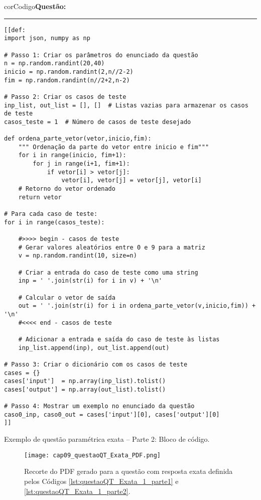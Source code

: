 \begin{listing}[!h]
\begin{myboxCode}{corCodigo}{\textbf{Questão: }}\vspace{3mm}
\hrule
\begin{verbatim}
[[def: 
import json, numpy as np

# Passo 1: Criar os parâmetros do enunciado da questão
n = np.random.randint(20,40)
inicio = np.random.randint(2,n//2-2)
fim = np.random.randint(n//2+2,n-2)
    
# Passo 2: Criar os casos de teste
inp_list, out_list = [], []  # Listas vazias para armazenar os casos de teste
casos_teste = 1  # Número de casos de teste desejado

def ordena_parte_vetor(vetor,inicio,fim):        
    """ Ordenação da parte do vetor entre inicio e fim"""
    for i in range(inicio, fim+1):
        for j in range(i+1, fim+1):
            if vetor[i] > vetor[j]:
                vetor[i], vetor[j] = vetor[j], vetor[i]
    # Retorno do vetor ordenado
    return vetor
    
# Para cada caso de teste:
for i in range(casos_teste):    

    #>>>> begin - casos de teste
    # Gerar valores aleatórios entre 0 e 9 para a matriz 
    v = np.random.randint(10, size=n) 

    # Criar a entrada do caso de teste como uma string
    inp = ' '.join(str(i) for i in v) + '\n'

    # Calcular o vetor de saída
    out = ' '.join(str(i) for i in ordena_parte_vetor(v,inicio,fim)) + '\n'
    #<<<< end - casos de teste

    # Adicionar a entrada e saída do caso de teste às listas
    inp_list.append(inp), out_list.append(out)

# Passo 3: Criar o dicionário com os casos de teste
cases = {}
cases['input']  = np.array(inp_list).tolist()
cases['output'] = np.array(out_list).tolist()

# Passo 4: Mostrar um exemplo no enunciado da questão
caso0_inp, caso0_out = cases['input'][0], cases['output'][0]
]]
\end{verbatim}
\end{myboxCode}
\caption{Exemplo de questão paramétrica exata -- Parte 2: Bloco de código.}
\label{lst:questaoQT_Exata_1_parte2}
\end{listing}


\begin{figure}[!ht]
  \texttt{[image: cap09\_questaoQT\_Exata\_PDF.png]}
  \caption{Recorte do PDF gerado para a questão com resposta exata definida pelos Códigos \ref{lst:questaoQT_Exata_1_parte1} e \ref{lst:questaoQT_Exata_1_parte2}.}
  \label{fig:cap09_questaoQT_Exata_PDF}
\end{figure}

